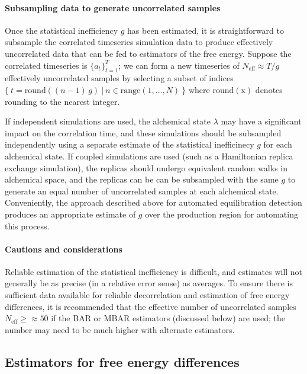 \documentclass[9pt,bestpractices]{livecoms}
\begin{document}
\paragraph{Subsampling data to generate uncorrelated samples}
Once the statistical inefficiency $g$ has been estimated, it is straightforward to subsample the correlated timeseries simulation data to produce effectively uncorrelated data that can be fed to estimators of the free energy.
Suppose the correlated timeseries is $\{a_t\}_{t=1}^T$; we can form a new timeseries of $N_{\mathrm{eff}} \approx T / g$ effectively uncorrelated samples by selecting a subset of indices $\{ \: t = \mathrm{round}((n-1) \, g) \: | \: n \in \mathrm{range}(1,\ldots ,N) \: \}$ where $\mathrm{round(x)}$ denotes rounding to the nearest integer.

If independent simulations are used, the alchemical state $\lambda$ may have a significant impact on the correlation time, and these simulations should be subsampled independently using a separate estimate of the statistical inefficinecy $g$ for each alchemical state.
If coupled simulations are used (such as a Hamiltonian replica exchange simulation), the replicas should undergo equivalent random walks in alchemical space, and the replicas can be can be subsampled with the same $g$ to generate an equal number of uncorrelated samples at each alchemical state.
Conveniently, the approach described above for automated equilibration detection produces an appropriate estimate of $g$ over the production region for automating this process.

\paragraph{Cautions and considerations}
Reliable estimation of the statistical inefficiency is difficult, and estimates will not generally be as precise (in a relative error sense) as averages.
To ensure there is sufficient data available for reliable decorrelation and estimation of free energy differences, it is recommended that the effective number of uncorrelated samples $N_{\mathrm{eff}} \ge \approx 50$ if the BAR or MBAR estimators (discussed below) are used; the number may need to be much higher with alternate estimators.

\subsection{Estimators for free energy differences}
\end{document}
